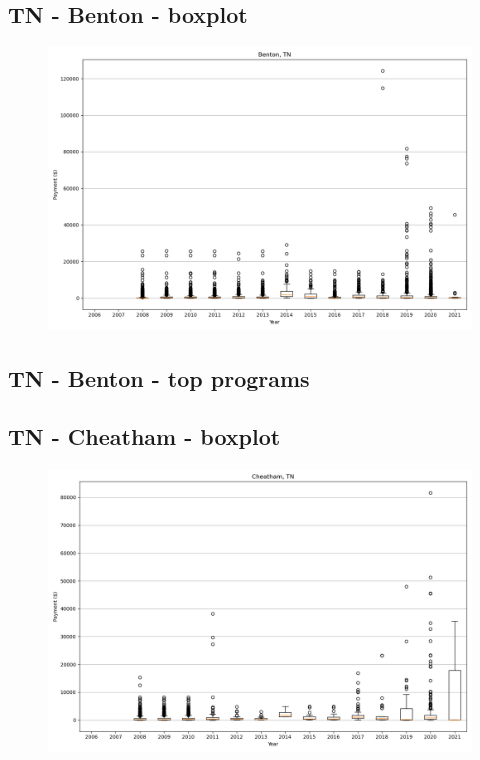 \subsection*{TN - Benton - boxplot}
\begin{figure}[h]
\centering
\includegraphics[width=7in]{../output/boxplots/counties/Benton-TN_boxplot.png}
\end{figure}


\subsection*{TN - Benton - top programs}

\newpage
\subsection*{TN - Cheatham - boxplot}
\begin{figure}[h]
\centering
\includegraphics[width=7in]{../output/boxplots/counties/Cheatham-TN_boxplot.png}
\end{figure}


